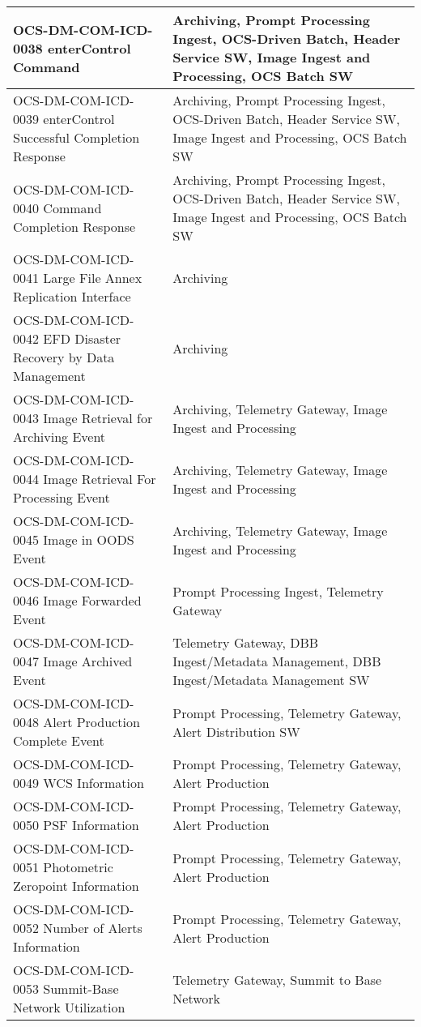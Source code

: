 \begin{longtable}{p{}p{}}
OCS-DM-COM-ICD-0038 enterControl Command & Archiving, Prompt Processing Ingest, OCS-Driven Batch, Header Service SW, Image Ingest and Processing, OCS Batch SW \\ \hline
OCS-DM-COM-ICD-0039 enterControl Successful Completion Response & Archiving, Prompt Processing Ingest, OCS-Driven Batch, Header Service SW, Image Ingest and Processing, OCS Batch SW \\ \hline
OCS-DM-COM-ICD-0040 Command Completion Response & Archiving, Prompt Processing Ingest, OCS-Driven Batch, Header Service SW, Image Ingest and Processing, OCS Batch SW \\ \hline
OCS-DM-COM-ICD-0041 Large File Annex Replication Interface & Archiving \\ \hline
OCS-DM-COM-ICD-0042 EFD Disaster Recovery by Data Management & Archiving \\ \hline
OCS-DM-COM-ICD-0043 Image Retrieval for Archiving Event & Archiving, Telemetry Gateway, Image Ingest and Processing \\ \hline
OCS-DM-COM-ICD-0044 Image Retrieval For Processing Event & Archiving, Telemetry Gateway, Image Ingest and Processing \\ \hline
OCS-DM-COM-ICD-0045 Image in OODS Event & Archiving, Telemetry Gateway, Image Ingest and Processing \\ \hline
OCS-DM-COM-ICD-0046 Image Forwarded Event & Prompt Processing Ingest, Telemetry Gateway \\ \hline
OCS-DM-COM-ICD-0047 Image Archived Event & Telemetry Gateway, DBB Ingest/Metadata Management, DBB Ingest/Metadata Management SW \\ \hline
OCS-DM-COM-ICD-0048 Alert Production Complete Event & Prompt Processing, Telemetry Gateway, Alert Distribution SW \\ \hline
OCS-DM-COM-ICD-0049 WCS Information & Prompt Processing, Telemetry Gateway, Alert Production \\ \hline
OCS-DM-COM-ICD-0050 PSF Information & Prompt Processing, Telemetry Gateway, Alert Production \\ \hline
OCS-DM-COM-ICD-0051 Photometric Zeropoint Information & Prompt Processing, Telemetry Gateway, Alert Production \\ \hline
OCS-DM-COM-ICD-0052 Number of Alerts Information & Prompt Processing, Telemetry Gateway, Alert Production \\ \hline
OCS-DM-COM-ICD-0053 Summit-Base Network Utilization & Telemetry Gateway, Summit to Base Network \\ \hline

\end{longtable}
